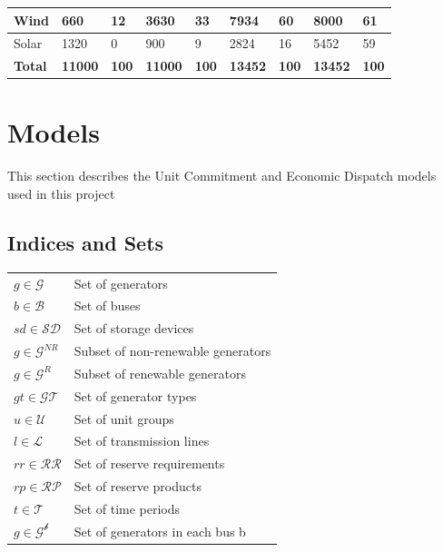 \documentclass[12pt,LUDisStyle,twosided]{book}
\newcommand{\mc}{\mathcal}
\begin{document}
\begin{table}[h]
\begin{tabular}{|lllllll|l|l|}
Wind           & 660                 & 12                & 3630                & 33                & 7934                 & 60                & 8000                 & 61                \\ \hline
Solar          & 1320                & 0                 & 900                 & 9                 & 2824                 & 16                & 5452                 & 59                \\ \hline
\textbf{Total} & \textbf{11000}      & \textbf{100}      & \textbf{11000}      & \textbf{100}      & \textbf{13452}       & \textbf{100}      & \textbf{13452}       & \textbf{100}      \\ \hline
\end{tabular}
\label{table:ScenarioDataDescription}
\end{table}


\section{Models}

This section describes the Unit Commitment and Economic Dispatch models used in this project

\subsection{Indices and Sets}

\begin{tabular}{ll}

$g \in \mc{G} $& Set of generators\\
$b \in \mc{B} $& Set of buses\\
$sd \in \mc{SD} $& Set of storage devices\\
$g \in \mc{G}^{NR} $& Subset of non-renewable generators\\
$g \in \mc{G}^{R} $& Subset of renewable generators \\
$gt \in \mc{GT} $& Set of generator types \\
$u \in \mc{U} $& Set of unit groups \\
$l \in \mc{L} $& Set of transmission lines \\
$rr \in \mc{RR} $& Set of reserve requirements \\
$rp \in \mc{RP} $& Set of reserve products \\
$t \in \mc{T} $& Set of time periods \\
$g \in \mc{G^{b}} $& Set of generators in each bus b \\


\end{tabular}
\end{document}
